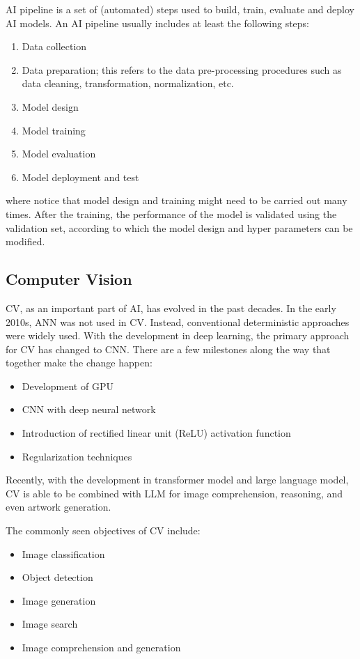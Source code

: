 AI pipeline is a set of (automated) steps used to build, train, evaluate and deploy AI models. An AI pipeline usually includes at least the following steps:
\begin{enumerate}
  \item Data collection
  \item Data preparation; this refers to the data pre-processing procedures such as data cleaning, transformation, normalization, etc.
  \item Model design
  \item Model training
  \item Model evaluation
  \item Model deployment and test
\end{enumerate}
where notice that model design and training might need to be carried out many times. After the training, the performance of the model is validated using the validation set, according to which the model design and hyper parameters can be modified.

\subsection{Computer Vision}

CV, as an important part of AI, has evolved in the past decades. In the early 2010s, ANN was not used in CV. Instead, conventional deterministic approaches were widely used. With the development in deep learning, the primary approach for CV has changed to CNN. There are a few milestones along the way that together make the change happen:
\begin{itemize}
  \item Development of GPU
  \item CNN with deep neural network
  \item Introduction of rectified linear unit (ReLU) activation function
  \item Regularization techniques
\end{itemize}
Recently, with the development in transformer model and large language model, CV is able to be combined with LLM for image comprehension, reasoning, and even artwork generation.

The commonly seen objectives of CV include:
\begin{itemize}
  \item Image classification
  \item Object detection
  \item Image generation
  \item Image search
  \item Image comprehension and generation
\end{itemize}

